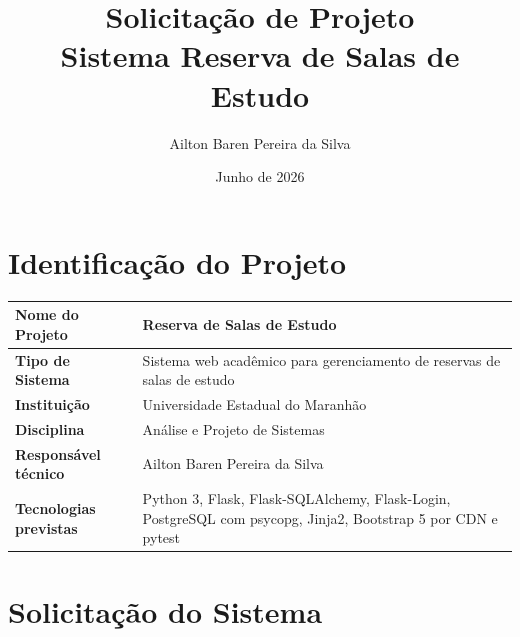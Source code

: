 \documentclass[12pt,a4paper]{article}
\title{\textbf{Solicitação de Projeto}\\Sistema Reserva de Salas de Estudo}
\author{Ailton Baren Pereira da Silva}
\date{Junho de 2026}
\begin{document}
\maketitle

\section{Identificação do Projeto}

\begin{longtable}{|p{5cm}|p{10cm}|}
\hline
\textbf{Nome do Projeto} & Reserva de Salas de Estudo \\ \hline
\textbf{Tipo de Sistema} & Sistema web acadêmico para gerenciamento de reservas de salas de estudo \\ \hline
\textbf{Instituição} & Universidade Estadual do Maranhão \\ \hline
\textbf{Disciplina} & Análise e Projeto de Sistemas \\ \hline
\textbf{Responsável técnico} & Ailton Baren Pereira da Silva \\ \hline
\textbf{Tecnologias previstas} & Python 3, Flask, Flask-SQLAlchemy, Flask-Login, PostgreSQL com psycopg, Jinja2, Bootstrap 5 por CDN e pytest \\ \hline
\end{longtable}

\section{Solicitação do Sistema}
\end{document}
